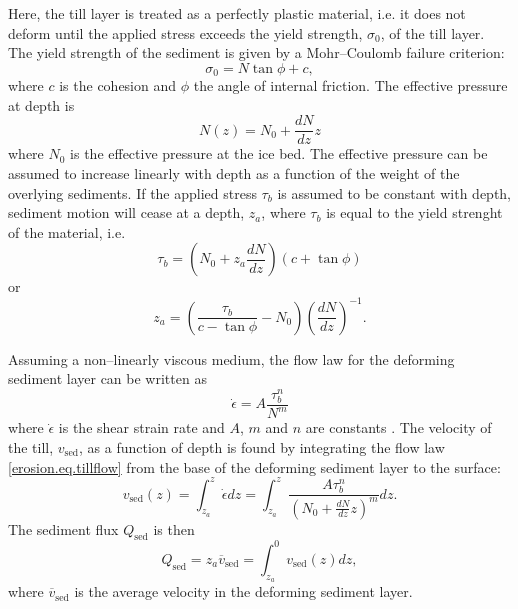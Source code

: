 Here, the till layer is treated as a perfectly plastic material, i.e. it does not deform until the applied stress exceeds the yield strength, $\sigma_0$, of the till layer. The yield strength of the sediment is given by a Mohr--Coulomb failure criterion:
\begin{equation}
  \sigma_0=N\tan\phi+c,
\end{equation}
where $c$ is the cohesion and $\phi$ the angle of internal friction. The effective pressure at depth is
\begin{equation}
  N(z)=N_0+\frac{dN}{dz}z
\end{equation}
where $N_0$ is the effective pressure at the ice bed. The effective pressure can be assumed to increase linearly with depth as a function of the weight of the overlying sediments. If the applied stress $\tau_b$ is assumed to be constant with depth, sediment motion will cease at a depth, $z_a$, where $\tau_b$ is equal to the yield strenght of the material, i.e.
\begin{equation}
  \tau_b=\left(N_0+z_a\frac{dN}{dz}\right)\left(c+\tan\phi\right)
\end{equation}
or
\begin{equation}
  \label{erosion.eq.sed_thick}
  z_a=\left(\frac{\tau_b}{c-\tan\phi}-N_0\right)\left({\frac{dN}{dz}}\right)^{-1}.
\end{equation}

Assuming a non--linearly viscous medium, the flow law for the deforming sediment layer can be written as
\begin{equation}
  \dot\epsilon=A\frac{\tau_b^n}{N^m}
  \label{erosion.eq.tillflow}
\end{equation}
where $\dot\epsilon$ is the shear strain rate and $A$, $m$ and $n$ are constants \citep{Boulton1996a}. The velocity of the till, $v_{\text{sed}}$, as a function of depth is found by integrating the flow law \eqref{erosion.eq.tillflow} from the base of the deforming sediment layer to the surface:
\begin{equation}
  \label{erosion.eq.tillvelo}
  v_{\text{sed}}(z)=\int_{z_a}^z\dot\epsilon dz=\int_{z_a}^z\frac{A\tau_b^n}{\left(N_0+\frac{dN}{dz}z\right)^m}dz.
\end{equation}
The sediment flux $Q_{\text{sed}}$ is then
\begin{equation}
  \label{erosion.eq.tillflux}
  Q_{\text{sed}}=z_a\overline{v}_{\text{sed}}=\int_{z_a}^0v_{\text{sed}}(z)dz,
\end{equation}
where $\overline{v}_{\text{sed}}$ is the average velocity in the deforming sediment layer.
